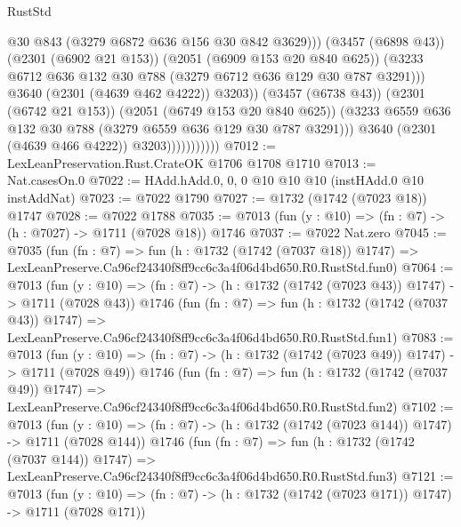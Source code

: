 \begin{lexlean}{RustStd}
\begin{coremodule}
                                      @30
                                      @843
                                      (@3279 @6872 @636 @156 @30 @842 @3629)))
                                  (@3457 (@6898 @43))
                                  (@2301 (@6902 @21 @153))
                                  (@2051 (@6909 @153 @20 @840 @625))
                                  (@3233
                                    @6712
                                    @636
                                    @132
                                    @30
                                    @788
                                    (@3279 @6712 @636 @129 @30 @787 @3291)))
                                @3640
                                (@2301 (@4639 @462 @4222))
                                @3203))
                            (@3457 (@6738 @43))
                            (@2301 (@6742 @21 @153))
                            (@2051 (@6749 @153 @20 @840 @625))
                            (@3233 @6559 @636 @132 @30 @788 (@3279 @6559 @636 @129 @30 @787 @3291)))
                          @3640
                          (@2301 (@4639 @466 @4222))
                          @3203)))))))))))
@7012 := LexLeanPreservation.Rust.CrateOK @1706 @1708 @1710
@7013 := Nat.casesOn.{0}
@7022 := HAdd.hAdd.{0, 0, 0} @10 @10 @10 (instHAdd.{0} @10 instAddNat)
@7023 := @7022 @1790
@7027 := @1732 (@1742 (@7023 @18)) @1747
@7028 := @7022 @1788
@7035 := @7013 (fun (y : @10) => (fn : @7) -> (h : @7027) -> @1711 (@7028 @18)) @1746
@7037 := @7022 Nat.zero
@7045 := @7035
    (fun (fn : @7) =>
    fun (h : @1732 (@1742 (@7037 @18)) @1747) =>
    LexLeanPreserve.Ca96cf24340f8ff9cc6c3a4f06d4bd650.R0.RustStd.fun0)
@7064 := @7013
    (fun (y : @10) => (fn : @7) -> (h : @1732 (@1742 (@7023 @43)) @1747) -> @1711 (@7028 @43))
    @1746
    (fun (fn : @7) =>
    fun (h : @1732 (@1742 (@7037 @43)) @1747) =>
    LexLeanPreserve.Ca96cf24340f8ff9cc6c3a4f06d4bd650.R0.RustStd.fun1)
@7083 := @7013
    (fun (y : @10) => (fn : @7) -> (h : @1732 (@1742 (@7023 @49)) @1747) -> @1711 (@7028 @49))
    @1746
    (fun (fn : @7) =>
    fun (h : @1732 (@1742 (@7037 @49)) @1747) =>
    LexLeanPreserve.Ca96cf24340f8ff9cc6c3a4f06d4bd650.R0.RustStd.fun2)
@7102 := @7013
    (fun (y : @10) => (fn : @7) -> (h : @1732 (@1742 (@7023 @144)) @1747) -> @1711 (@7028 @144))
    @1746
    (fun (fn : @7) =>
    fun (h : @1732 (@1742 (@7037 @144)) @1747) =>
    LexLeanPreserve.Ca96cf24340f8ff9cc6c3a4f06d4bd650.R0.RustStd.fun3)
@7121 := @7013
    (fun (y : @10) => (fn : @7) -> (h : @1732 (@1742 (@7023 @171)) @1747) -> @1711 (@7028 @171))

\end{coremodule}
\end{lexlean}
